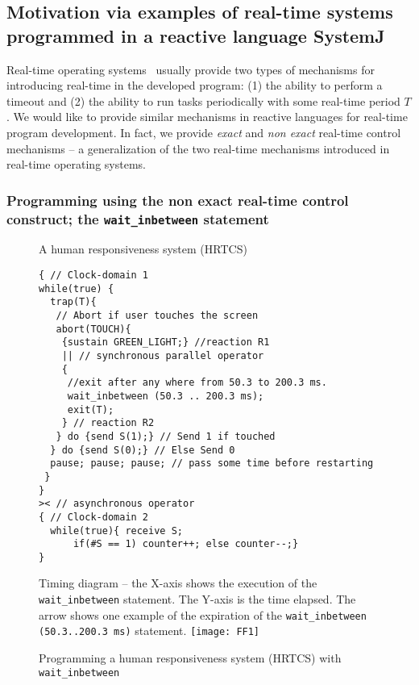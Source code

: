 \subsection{Motivation via examples of real-time systems programmed in a
reactive language SystemJ}
\label{sec:motivating-example}


Real-time operating systems~\cite{barry2009using} usually provide two
types of mechanisms for introducing real-time in the developed program:
(1) the ability to perform a timeout and (2) the ability to run tasks
periodically with some real-time period $T$. We would like to provide
similar mechanisms in reactive languages for real-time program
development. In fact, we provide \textit{exact} and \textit{non exact}
real-time control mechanisms -- a generalization of the two real-time
mechanisms introduced in real-time operating systems.

\subsubsection{Programming using the non exact real-time control
  construct; the \textrm{\texttt{wait\_inbetween}} statement}
\label{sec:progr-using-non}

\begin{figure}[t!]
	\vspace{-10pt}
        \begin{SubFloat}{\label{delaycode:a}A human responsiveness
            system (HRTCS)}
        \begin{lstlisting}[style=sysj,morekeywords={sustain,send,receive,abort,await,emit,present,trap,pause,exit,wait_inbetween,wait_exact,suspend}]
{ // Clock-domain 1
while(true) {
  trap(T){
   // Abort if user touches the screen
   abort(TOUCH){
    {sustain GREEN_LIGHT;} //reaction R1
    || // synchronous parallel operator
    {
     //exit after any where from 50.3 to 200.3 ms.
     wait_inbetween (50.3 .. 200.3 ms); 
     exit(T); 
    } // reaction R2
   } do {send S(1);} // Send 1 if touched 
  } do {send S(0);} // Else Send 0
  pause; pause; pause; // pass some time before restarting
 }
}
>< // asynchronous operator
{ // Clock-domain 2
  while(true){ receive S; 
      if(#S == 1) counter++; else counter--;}
}
\end{lstlisting}
\end{SubFloat}
\begin{SubFloat}{\label{d:b}Timing diagram -- the X-axis shows the
    execution of the \texttt{wait\_inbetween} statement. The Y-axis is
    the time elapsed. The arrow shows one example of the expiration of
    the \mbox{\texttt{wait\_inbetween (50.3..200.3 ms)}} statement.}
    \centering
    \texttt{[image: FF1]}
\end{SubFloat}
\caption{Programming a human responsiveness system (HRTCS) with
  \texttt{wait\_inbetween}}
\label{fig:1}
\end{figure}

